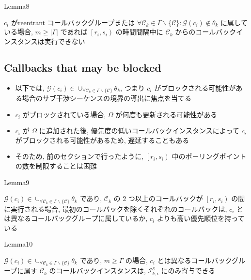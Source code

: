 \begin{frame}{Lemma8}
    \begin{lemma}[]
        $c_{i}$ がreentrant コールバックグループまたは $\forall \mathcal{C}_{k} \in \Gamma \backslash\{\mathcal{C}\}: \mathcal{G}\left(c_{i}\right) \notin \theta_{k}$ に属している場合, $m \geq|\Gamma|$ であれば $\left[r_{i}, s_{i}\right)$ の時間間隔中に $\mathcal{C}_{k}$ からのコールバックインスタンスは実行できない
    \end{lemma}
\end{frame}


\subsection{Callbacks that may be blocked}
\label{ssec: callbacks_that_may_be_blocked}

\begin{frame}{}
    \begin{itemize}
        \item 以下では, $\mathcal{G}\left(c_{i}\right) \in \cup_{\forall \mathcal{C}_{k} \in \Gamma \backslash\{\mathcal{C}\}} \theta_{k}$, つまり $c_{i}$ がブロックされる可能性がある場合のサブ干渉シーケンスの境界の導出に焦点を当てる
        \item $c_{i}$ がブロックされている場合, $\Omega$ が何度も更新される可能性がある
        \item $c_{i}$ が $\Omega$ に追加された後, 優先度の低いコールバックインスタンスによって $c_{i}$ がブロックされる可能性があるため, 遅延することもある
        \item そのため, 前のセクションで行ったように, $\left[r_{i}, s_{i}\right)$ 中のポーリングポイントの数を制限することは困難
    \end{itemize}
\end{frame}

\begin{frame}{Lemma9}
    \begin{lemma}[]
        $\mathcal{G}\left(c_{i}\right) \in \cup_{\forall \mathcal{C}_{k} \in \Gamma \backslash\{\mathcal{C}\}} \theta_{k}$ であり, $\mathcal{C}_{k}$ の 2 つ以上のコールバックが $\left[r_{i}, s_{i}\right)$ の間に実行される場合, 最初のコールバックを除くそれぞれのコールバックは, $c_{i}$ とは異なるコールバックグループに属しているか, $c_{i}$ よりも高い優先順位を持っている
    \end{lemma}
\end{frame}

\begin{frame}{Lemma10}
    \begin{lemma}[]
        $\mathcal{G}\left(c_{i}\right) \in \cup_{\forall \mathcal{C}_{k} \in \Gamma \backslash\{\mathcal{C}\}} \theta_{k}$ であり, $m \geq \Gamma$ の場合, $c_{i}$ とは異なるコールバックグループに属す $\mathcal{C}_{k}$ のコールバックインスタンスは, $\mathcal{I}_{k, i}^{\mathcal{E}}$ にのみ寄与できる
    \end{lemma}
\end{frame}


